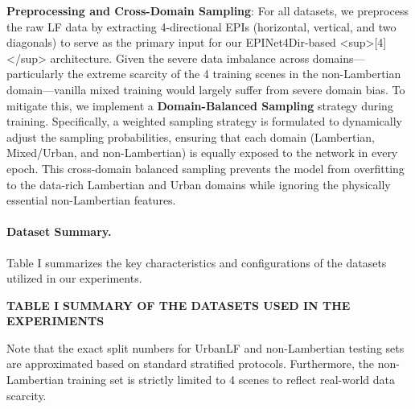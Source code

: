\textbf{Preprocessing and Cross-Domain Sampling}: 
For all datasets, we preprocess the raw LF data by extracting 4-directional EPIs (horizontal, vertical, and two diagonals) to serve as the primary input for our EPINet4Dir-based <sup>[4]</sup> architecture. Given the severe data imbalance across domains—particularly the extreme scarcity of the 4 training scenes in the non-Lambertian domain—vanilla mixed training would largely suffer from severe domain bias. To mitigate this, we implement a \textbf{Domain-Balanced Sampling} strategy during training. Specifically, a weighted sampling strategy is formulated to dynamically adjust the sampling probabilities, ensuring that each domain (Lambertian, Mixed/Urban, and non-Lambertian) is equally exposed to the network in every epoch. This cross-domain balanced sampling prevents the model from overfitting to the data-rich Lambertian and Urban domains while ignoring the physically essential non-Lambertian features.

\paragraph{Dataset Summary.}
Table I summarizes the key characteristics and configurations of the datasets utilized in our experiments.

\textbf{TABLE I}
\textbf{SUMMARY OF THE DATASETS USED IN THE EXPERIMENTS}

\begin{table}[!t]
\small
\caption{Dataset Domain / Scene Type Scenes (Train/Test).}
\label{tab:table1}
\centering
{}
\end{table}
Note that the exact split numbers for UrbanLF and non-Lambertian testing sets are approximated based on standard stratified protocols. Furthermore, the non-Lambertian training set is strictly limited to 4 scenes to reflect real-world data scarcity.

